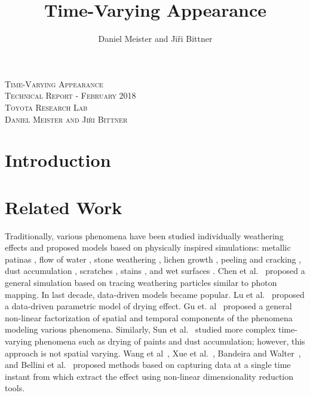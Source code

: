 \documentclass[11pt]{article}
\author{Daniel Meister and Ji\v{r}i Bittner}
\title{Time-Varying Appearance}
\begin{document}
\begin{center}
\textsc{\LARGE Time-Varying Appearance}\\[0.4cm]
\textsc{\Large Technical Report - February 2018}\\[0.4cm]
\textsc{\large Toyota Research Lab}\\[0.4cm]
\textsc{\normalsize Daniel Meister and Ji\v{r}i Bittner}\\[0.5cm]
\end{center}

\section{Introduction}

\section{Related Work}
Traditionally, various phenomena have been studied individually weathering effects and proposed models based on physically inspired simulations: metallic patinas \cite{Dorsey1996a}, flow of water \cite{Dorsey1996b}, stone weathering \cite{Dorsey1999,Xue2011}, lichen growth \cite{Desbenoit2004}, peeling and cracking \cite{Paquette2002}, dust accumulation \cite{Hsu1995}, scratches \cite{Bosch2004}, stains \cite{Bosch2011}, and wet surfaces \cite{Nakamae1990,Jensen1999}. Chen et al.~\cite{Chen2005} proposed a general simulation based on tracing weathering particles similar to photon mapping. In last decade, data-driven models became popular. Lu et al.~\cite{Lu2006} proposed a data-driven parametric model of drying effect. Gu et. al~\cite{Gu2006} proposed a general non-linear factorization of spatial and temporal components of the phenomena modeling various phenomena. Similarly, Sun et al.~\cite{Sun2007} studied more complex time-varying phenomena such as drying of paints and dust accumulation; however, this approach is not spatial varying. Wang et al~\cite{Wang2006}, Xue et al.~\cite{Xue2008}, Bandeira and Walter~\cite{Bandeira2009}, and Bellini et al.~\cite{Bellini2016} proposed methods based on capturing data at a single time instant from which extract the effect using non-linear dimensionality reduction tools.

\end{document}
